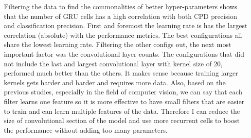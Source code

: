 Filtering the data to find the commonalities of better hyper-parameters shows that the number of GRU cells has a high correlation with both CPD precision and classification precision. 
First and foremost the learning rate is has the largest correlation (absolute) with the performance metrics. The best configurations all share the lowest learning rate.
Filtering the other configs out, the next most important factor was the convolutional layer counts. 
The configurations that did not include the last and largest convolutional layer with kernel size of 20, performed much better than the others. 
It makes sense because training larger kernels gets harder and harder and requires more data. 
Also, based on the previous studies, especially in the field of computer vision, we can say that each filter learns one feature so it is more effective to have small filters that are easier to train and can learn multiple features of the data.
Therefore I can reduce the size of convolutional section of the model and use more recurrent cells to boost the performance without adding too many parameters. 



